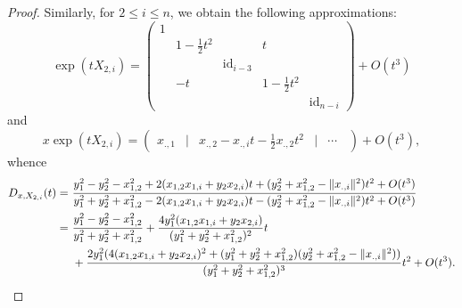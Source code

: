 \documentclass[11pt,oneside]{amsart}
\numberwithin{equation}{section}
\theoremstyle{remark}
\theoremstyle{plain}
\newcommand\id{\mathrm{id}}
\renewcommand\leq{\leqslant}
\begin{document}
\begin{proof}
Similarly, for $2 \leq i \leq n$, we obtain the following approximations:
$$\exp(t X_{2,i}) = \left(\begin{matrix}1 & & & & \\ & 1 - \frac{1}{2} t^2 & & t & \\ & & \boxed{\id_{i-3}} & \\ & - t & & 1 - \frac{1}{2}t^2 & \\ &&&&\boxed{ \id_{n-i} } \end{matrix}\right) + O(t^3)$$
and
$$x \exp(t X_{2,i}) = \left( \begin{matrix} x_{., 1} &|& x_{., 2} - x_{., i} t - \frac{1}{2} x_{., 2}t^2 &|& \cdots \ \;\end{matrix}\right) + O(t^3),$$
whence
\begin{align}
\notag D_{x,X_{2,i}}(t) =\ & \frac{y_1^2-y_2^2-x_{1,2}^2+2(x_{1,2}x_{1,i}+y_2x_{2,i})t+(y_2^2+x_{1,2}^2-\|x_{.,i}\|^2)t^2+O(t^3)}{y_1^2+y_2^2+x_{1,2}^2-2(x_{1,2}x_{1,i}+y_2x_{2,i})t-(y_2^2+x_{1,2}^2-\|x_{.,i}\|^2)t^2+O(t^3)}\\
\label{x2j} = \ & \frac{y_1^2 - y_2^2 - x_{1,2}^2}{y_1^2 + y_2^2 + x_{1,2}^2} + \frac{ 4y_1^2 ( x_{1,2}x_{1,i} + y_2 x_{2,i})}{(y_1^2 + y_2^2 + x_{1,2}^2)^2} t \\
\notag & + \frac{2 y_1^2 (4( x_{1,2}x_{1,i} + y_2 x_{2,i})^2 + (y_1^2 + y_2^2 + x_{1,2}^2)
(y_2^2 + x_{1,2}^2 - \|x_{.,i}\|^2))}{(y_1^2 + y_2^2 + x_{1,2}^2)^3} t^2 + O(t^3).
\end{align}


\end{proof}
\end{document}
